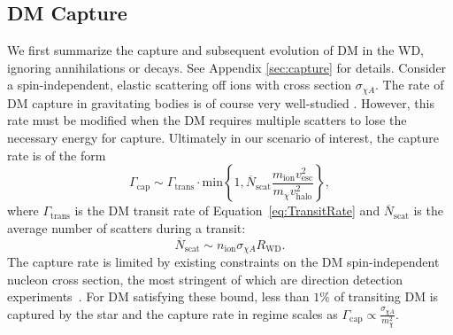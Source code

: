 \subsection{DM Capture}
We first summarize the capture and subsequent evolution of DM in the WD, ignoring annihilations or decays. 
See Appendix \ref{sec:capture} for details. 
Consider a spin-independent, elastic scattering off ions with cross section $\sigma_{\chi A}$. 
The rate of DM capture in gravitating bodies is of course very well-studied \cite{Press:1985ug, Gould:1987ir}. 
However, this rate must be modified when the DM requires multiple scatters to lose the necessary energy for capture. 
Ultimately in our scenario of interest, the capture rate is of the form
\begin{equation}
\Gamma_\text{cap} \sim \Gamma_\text{trans} \cdot \text{min}\left \{1, \overbar{N}_\text{scat} \frac{m_\text{ion} v_\text{esc}^2}{m_\chi v_\text{halo}^2}  \right \}, 
\end{equation}
where $\Gamma_\text{trans}$ is the DM transit rate of Equation~\eqref{eq:TransitRate} and $\overbar{N}_\text{scat}$ is the average number of scatters during a transit:
\begin{equation}
\overbar{N}_\text{scat} \sim n_\text{ion} \sigma_{\chi A} R_\text{WD}.
\end{equation}
The capture rate is limited by existing constraints on the DM spin-independent nucleon cross section, the most stringent of which are direction detection experiments~\cite{Aprile:2017iyp}. 
For DM satisfying these bound, less than $1 \%$ of transiting DM is captured by the star and the capture rate in regime scales as $\Gamma_\text{cap} \propto \frac{\sigma_{\chi A}}{m_\chi^2}$. 

